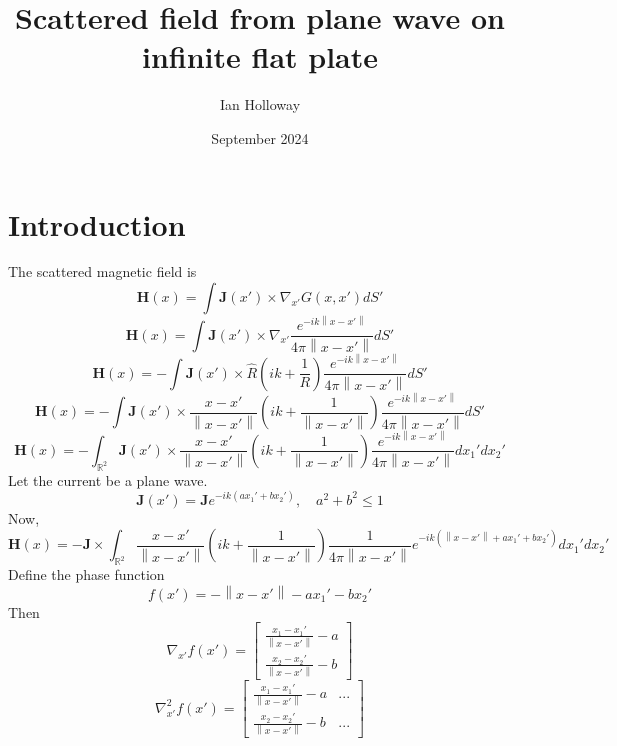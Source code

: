 \documentclass{article}
\title{Scattered field from plane wave on infinite flat plate}
\author{Ian Holloway}
\date{September 2024}
\newcommand{\norm}[1]{\left\lVert #1 \right\rVert}
\theoremstyle{plain}
\begin{document}
\maketitle

\section{Introduction}\label{sec_intro}

The scattered magnetic field is
\begin{equation}
	\mathbf{H}(x) = \int \mathbf{J}(x') \times \nabla_{x'} G(x,x') dS'
\end{equation}
\begin{equation}
	\mathbf{H}(x)
	= \int \mathbf{J}(x') \times \nabla_{x'} \frac{e^{-ik\norm{x-x'}}}{4\pi\norm{x-x'}} dS'
\end{equation}
\begin{equation}
	\mathbf{H}(x)
	= -\int \mathbf{J}(x') \times \hat{R} \left( ik + \frac{1}{R} \right) \frac{e^{-ik\norm{x-x'}}}{4\pi\norm{x-x'}} dS'
\end{equation}
\begin{equation}
	\mathbf{H}(x)
	= -\int \mathbf{J}(x') \times \frac{x-x'}{\norm{x-x'}}
	\left( ik + \frac{1}{\norm{x-x'}} \right)
	\frac{e^{-ik\norm{x-x'}}}{4\pi\norm{x-x'}} dS'
\end{equation}
\begin{equation}
	\mathbf{H}(x)
	= -\int_{\mathbb{R}^2} \mathbf{J}(x') \times \frac{x-x'}{\norm{x-x'}}
	\left( ik + \frac{1}{\norm{x-x'}} \right)
	\frac{e^{-ik\norm{x-x'}}}{4\pi\norm{x-x'}} dx_1'dx_2'
\end{equation}
Let the current be a plane wave.
\begin{equation}
	\mathbf{J}(x') = \mathbf{J}e^{-ik(ax_1' + bx_2')}, \quad a^2 + b^2 \leq 1
\end{equation}
Now,
\begin{equation}
	\mathbf{H}(x)
	= -\mathbf{J} \times \int_{\mathbb{R}^2}
	\frac{x-x'}{\norm{x-x'}}
	\left( ik + \frac{1}{\norm{x-x'}} \right)
	\frac{1}{4\pi\norm{x-x'}}
	e^{-ik\left( \norm{x-x'} + ax_1' + bx_2' \right)} dx_1'dx_2'
\end{equation}
Define the phase function
\begin{equation}
	f(x') = -\norm{x-x'} - ax_1' - bx_2'
\end{equation}
Then
\begin{equation}
	\nabla_{x'} f(x') =
	\begin{bmatrix}
		\frac{x_1 - x_1'}{\norm{x-x'}} - a \\
		\frac{x_2 - x_2'}{\norm{x-x'}} - b
	\end{bmatrix}
\end{equation}
\begin{equation} %
	\nabla^2_{x'} f(x') =
	\begin{bmatrix}
		\frac{x_1 - x_1'}{\norm{x-x'}} - a & ... \\
		\frac{x_2 - x_2'}{\norm{x-x'}} - b & ...
	\end{bmatrix}
\end{equation}
\end{document}
